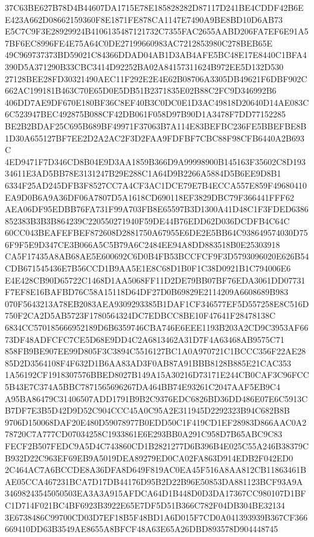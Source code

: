 \documentclass[UTF8,fontset=fandol,zihao=-4,a4paper]{ctexart}
\begin{document}
{{37C63BE627B78D4B44607DA1715E78E185828282D87117D241BE4CDDF42B6EE423A662D08662159360F8E1871FE878CA1147E7490A9BE8BD10D6AB73
E5C7C9F3E28929924B4106135487121732C7355FAC2655AABD206FA7EF6E91A57BF6EC8996FE4E75A64C0DE27199660983AC7212853980C278BEB65E
49C969737373BD59021C84366DDAD04AB1D3AB4AFE5BC48E17E8440C1BFA4390D5A371290B33CBC3414D92252BA02A84157311624B972EE5D132D530
27128BEE28FD30321490AEC11F292E2E4E62B08706A3305DB49621F6DBF902C662AC199181B463C70E65D0E5DB51B2371835E02B88C2FC9D346992B6
406DD7AE9DF670E180BF36C8EF40B3C0DC0E1D3AC49818D20640D14AE083C6C523947BEC492875B088CF42DB061F058D97B90D1A3478F7DD77152285
BE2B2BDAF25C695B689BF49971F37063B7A114E83BEFBC236FE5BBEFBE8B1D30A655127BF7EE2D2A2AC2F3D2FAA9FDFBF7CBC88F98CFB6440A2B693C
4ED9471F7D346CD8B04E9D3AA1859B366D9A99998900B145163F35602C8D19334611E3AD5BB78E3131247B29E288C1A64D9B2266A5884D5B6EE9D8B1
6334F25AD245DFB3F8527CC7A4CF3AC1DCE79E7B4ECCA557E859F49680410EA9D0B6A9A36DF06A7807D5A1618CD690118EF3829DBC79F366441FFF62
AEA06DF95EDBB76FA731F99A703FB8E65597B3D1300A41D48C1F3FDED6386852383B3B3B864239C220550271940F59DE44B76EDD62D036DCDFB4C64C
60CC043BEAFEFBEF872608D2881750A67955E6DE2E5BB64C938649574030D756F9F5E9D347CE3B066A5C5B79A6C2484EE94A8DD883518B0E25303918
CA5F17435A8AB68AE5E600692C6D0B4FB53BCCFCF9F3D5793096020E626B54CDB671545436E7B56CCD1B9AA5E1E8C68D1B0F1C38D0921B1C794006E6
E4E428CB90D65722C1468D1AA5068FF11D2DE79BB07BF76EDA3061DD07731F7EF8E16BAFBD76C58A15118D64DF27D0B69829E2114209A6608689B983
070F5643213A78EB2083AEA9309293385B1DAF1CF346577EF5D557258E8C516D750F2CA2D5AB5723F1780564324DC7EDBCC8BE10F47641F28478138C
6834CC570185666952189D6B6359746CBA746E6EEE1193B203A2CD9C3953AF6673DF48ADFCFC7CE5D68E9DD4C2A6813462A31D7F4A63468AB9575C71
858FB9BE907EE99D805F3C3894C5516127BC1A0A970721C1BCCC356F22AE2885D2D3564108F4F632D1B6AA83AD3F0AB87A91BBB8128B885E21CAC353
1A56192CF1918307576BBED8027B149A15A30216D73171E244CB0CAF3C96FCC5B43E7C374A5BBC7871565696267DA464BB74E93261C2047AAF5EB9C4
A95BA86479C31406507ADD1791B9B2C9376EDC6826BD36DD486E07E6C5913CB7DF7E3B5D42D9D52C904CCC45A0C95A2E311945D2292323B94C682B8B
9706D150068DAF20E480D59078977B0EDD50C1F419CD1EF28983D866AAC0A278720C7A777CD07034258C1933861E6E293BB0A291C958D7B65ABC9C83
FECF2B507FEDC9A5D4C743860CD1B2821277D6B396B4E025C55A246B38379CB932D22C963EF69EB9A5019DEA89279ED0CA02FA863D914EDB2F042ED0
2C464AC7A6BCCDE8A36DFA8D649F819AC0EA45F516A8AA812CB11863461BAE05CCA467231BCA7D17DB44176D95B2D22B96E50853DA881123BCF93A9A
34698243545050503EA3A3A915AFDCA64D1B448D0D3DA17367CC980107D1BFC1D714F021BC4BF6923B3922E65E7DF5D51B366C782F04DB304BE32134
3E6738486C99700CD03D7EF18B5F48BD1A6D015F7CD0A041393939B367CF366669410DD63B3549AE8655A8BFCF48A63E65A26DBD893578D904448745
}}
\end{document}
